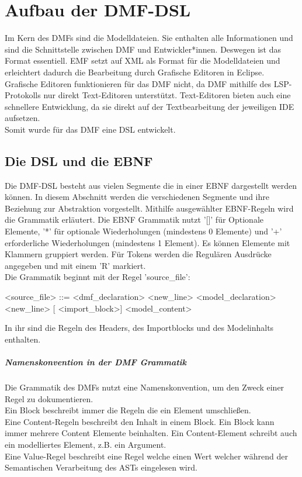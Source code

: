 \documentclass[./einleitung.tex]{subfiles}
\begin{document}
\section{Aufbau der DMF-DSL}
Im Kern des DMFs sind die Modelldateien.
Sie enthalten alle Informationen und sind die Schnittstelle zwischen DMF und Entwickler*innen.
Deswegen ist das Format essentiell.
EMF setzt auf XML als Format für die Modelldateien und erleichtert dadurch die Bearbeitung durch Grafische Editoren in Eclipse.
Grafische Editoren funktionieren für das DMF nicht, da DMF mithilfe des LSP-Protokolls nur direkt Text-Editoren unterstützt.
Text-Editoren bieten auch eine schnellere Entwicklung, da sie direkt auf der Textbearbeitung der jeweiligen IDE aufsetzen. \\
Somit wurde für das DMF eine DSL entwickelt.
\subsection{Die DSL und die EBNF}
Die DMF-DSL besteht aus vielen Segmente die in einer EBNF dargestellt werden können. In diesem Abschnitt werden die verschiedenen Segmente und ihre Beziehung zur Abstraktion vorgestellt. Mithilfe ausgewählter EBNF-Regeln wird die Grammatik erläutert.\newline \newline
Die EBNF Grammatik nutzt '[]' für Optionale Elemente, '*' für optionale Wiederholungen (mindestens 0 Elemente) und '+' erforderliche Wiederholungen (mindestens 1 Element).  Es können Elemente mit Klammern gruppiert werden. Für Tokens werden die Regulären Ausdrücke angegeben und mit einem 'R' markiert.\\

Die Grammatik beginnt mit der Regel 'source_file':
\begin{grammar}
<source_file> ::= <dmf_declaration> <new_line> <model_declaration> <new_line> [ <import_block>] <model_content>
\end{grammar}
In ihr sind die Regeln des Headers, des Importblocks und des Modelinhalts enthalten.

\subparagraph{Namenskonvention in der DMF Grammatik}
Die Grammatik des DMFs nutzt eine Namenskonvention, um den Zweck einer Regel zu dokumentieren.\\
Ein Block beschreibt immer die Regeln die ein Element umschließen. \\
Eine Content-Regeln beschreibt den Inhalt in einem Block. Ein Block kann immer mehrere Content Elemente beinhalten. Ein Content-Element schreibt auch ein modelliertes Element, z.B. ein Argument. \\
Eine Value-Regel beschreibt eine Regel welche einen Wert welcher während der Semantischen Verarbeitung des ASTs eingelesen wird.
\end{document}
